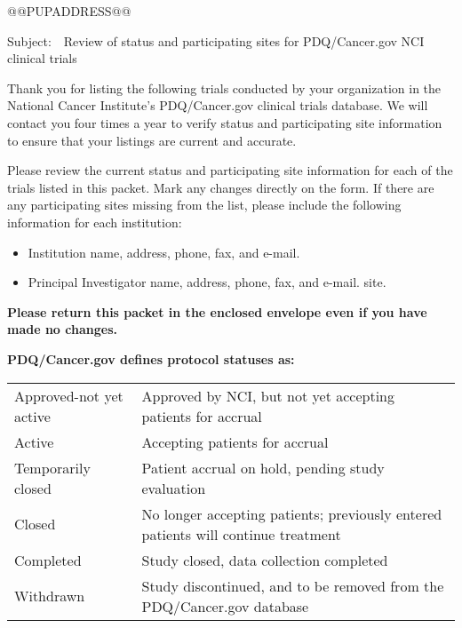 \documentclass[letterpaper,12pt]{letter}
\begin{document}
\thispagestyle{empty}

\LetterheadWithLogo
  
\vspace{36pt}

@@PUPADDRESS@@

Subject:\ \ Review of status and participating sites for PDQ/Cancer.gov NCI
clinical trials

Thank you for listing the following trials conducted by your organization in
the National Cancer Institute's PDQ/Cancer.gov clinical trials database.  We
will contact you four times a year to verify status and participating site
information to ensure that your listings are current and accurate.

Please review the current status and participating site information for each
of the trials listed in this packet.  Mark any changes directly on the form.
If there are any participating sites missing from the list, please include the
following information for each institution:

\begin{itemize}
 \item Institution name, address, phone, fax, and e-mail.
 \item Principal Investigator name, address, phone, fax, and e-mail.
 site. 
\end{itemize}

\textbf{Please return this packet in the enclosed envelope even if you have
    made no changes.}

\textbf{PDQ/Cancer.gov defines protocol statuses as:}

\begin{longtable}{p{2in}p{4in}}
Approved-not yet active & Approved by NCI, but not yet accepting
                          patients for accrual \\
Active                  & Accepting patients for accrual \\
Temporarily closed      & Patient accrual on hold, pending study evaluation \\
Closed                  & No longer accepting patients; previously entered
                          patients will continue treatment \\
Completed               & Study closed, data collection completed \\
Withdrawn               & Study discontinued, and to be removed from
                          the PDQ/Cancer.gov database
\end{longtable}
\end{document}
